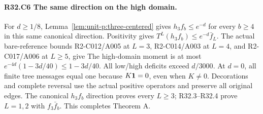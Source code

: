 \paragraph{R32.C6 The same direction on the high domain.}
For \(d\ge1/8\), Lemma~\ref{lem:unit-p:three-centered} gives
\(h_3f_b\le e^{-d}\) for every \(b\ge4\) in this same canonical
direction. Positivity gives
\(T^L(h_3f_b)\le e^{-d}\bar f_L\). The actual bare-reference bounds
R2-C012/A005 at \(L=3\), R2-C014/A003 at \(L=4\), and
R2-C017/A006 at \(L\ge5\), give
The high-domain moment is at most \(e^{-4d}(1-3d/40)\le1-3d/40\).
All low/high deficits exceed \(d/3000\). At \(d=0\), all finite tree
messages equal one because \(K\mathbf1=0\), even when \(K\ne0\).
Decorations and complete reversal use the actual positive operators and
preserve all original edges. The canonical \(h_3f_b\) direction proves
every \(L\ge3\); R32.3--R32.4 prove \(L=1,\allowbreak 2\) with \(f_3\bar f_b\).
This completes Theorem A.
